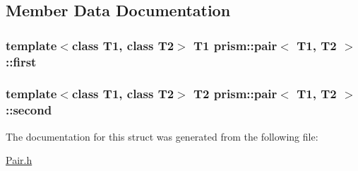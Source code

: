 \subsection{Member Data Documentation}
\subsubsection[{\texorpdfstring{first}{first}}]{\setlength{\rightskip}{0pt plus 5cm}template$<$class T1, class T2$>$ T1 {\bf prism\+::pair}$<$ T1, T2 $>$\+::first}\hypertarget{structprism_1_1pair_a71d9cdb495193c9a7fcca8fdfbedc19d}{}\label{structprism_1_1pair_a71d9cdb495193c9a7fcca8fdfbedc19d}
\subsubsection[{\texorpdfstring{second}{second}}]{\setlength{\rightskip}{0pt plus 5cm}template$<$class T1, class T2$>$ T2 {\bf prism\+::pair}$<$ T1, T2 $>$\+::second}\hypertarget{structprism_1_1pair_a283ff14678f78c074f5f270943727ef3}{}\label{structprism_1_1pair_a283ff14678f78c074f5f270943727ef3}


The documentation for this struct was generated from the following file\+:\begin{DoxyCompactItemize}
\item 
\hyperlink{_pair_8h}{Pair.\+h}\end{DoxyCompactItemize}
